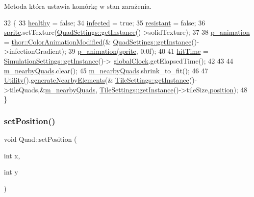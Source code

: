 Metoda która ustawia komórkę w stan zarażenia. 
\begin{DoxyCode}
32 \{
33     \mbox{\hyperlink{class_quad_a4994c09af588aeb08c482ea46494a08c}{healthy}} = \textcolor{keyword}{false};
34     \mbox{\hyperlink{class_quad_ae439ca631a9f51147b9d84a9c9df49c4}{infected}} = \textcolor{keyword}{true};
35     \mbox{\hyperlink{class_quad_ae2197ad46a2d7e409b2ca9e7ac25a80c}{resistant}} = \textcolor{keyword}{false};
36     \mbox{\hyperlink{class_quad_a83667bb824c1d6eca6c9c8b6e6d07d06}{sprite}}.setTexture(\mbox{\hyperlink{class_quad_settings_a20d7cfd0c56c11adcdf75c5e3011de67}{QuadSettings::getInstance}}()->solidTexture);
37 
38     \mbox{\hyperlink{class_quad_ace5b5f07a650f624aeb07806bc34d3f6}{p\_animation}} = \mbox{\hyperlink{classthor_1_1_color_animation_modified}{thor::ColorAnimationModified}}(&
      \mbox{\hyperlink{class_quad_settings_a20d7cfd0c56c11adcdf75c5e3011de67}{QuadSettings::getInstance}}()->infectionGradient);
39     \mbox{\hyperlink{class_quad_ace5b5f07a650f624aeb07806bc34d3f6}{p\_animation}}(\mbox{\hyperlink{class_quad_a83667bb824c1d6eca6c9c8b6e6d07d06}{sprite}}, 0.0f);
40 
41     \mbox{\hyperlink{class_quad_a30c2f4952b357ab59f018b766d2c9da2}{hitTime}} = \mbox{\hyperlink{class_simulation_settings_ab69bcd8bb611656b17d1f655d09a3004}{SimulationSettings::getInstance}}()->
      \mbox{\hyperlink{class_simulation_settings_acc1792d778ba9cd1d88d5e86a23373fb}{globalClock}}.getElapsedTime();
42 
43 
44     \mbox{\hyperlink{class_quad_ad66d1a97fdbecb53ea43af7361b4f124}{m\_nearbyQuads}}.clear();
45     \mbox{\hyperlink{class_quad_ad66d1a97fdbecb53ea43af7361b4f124}{m\_nearbyQuads}}.shrink\_to\_fit();
46 
47     \mbox{\hyperlink{class_utility}{Utility}}().\mbox{\hyperlink{class_utility_ae89bf9504ce0848783234853483da262}{generateNearbyElements}}(&
      \mbox{\hyperlink{class_tile_settings_a003ae6e78b97855c8592b2b4c0818914}{TileSettings::getInstance}}()->tileQuads,&\mbox{\hyperlink{class_quad_ad66d1a97fdbecb53ea43af7361b4f124}{m\_nearbyQuads}}, 
      \mbox{\hyperlink{class_tile_settings_a003ae6e78b97855c8592b2b4c0818914}{TileSettings::getInstance}}()->tileSize,\mbox{\hyperlink{class_quad_af0820dc173ffac240bcfe0a19dc2fe8a}{position}});
48 \}
\end{DoxyCode}
\mbox{\label{class_quad_a1f3970e8f264eabe131e20af7017f940}} 
\subsubsection{\texorpdfstring{set\+Position()}{setPosition()}}
{\footnotesize\ttfamily void Quad\+::set\+Position (\begin{DoxyParamCaption}\item[{int}]{x,  }\item[{int}]{y }\end{DoxyParamCaption})}

